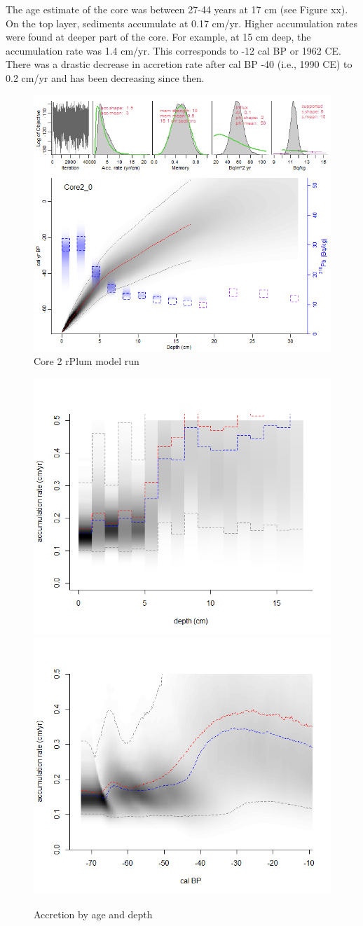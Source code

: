 \documentclass[
  12pt,
]{article}
\begin{document}
The age estimate of the core was between 27-44 years at 17 cm (see
Figure xx). On the top layer, sediments accumulate at 0.17 cm/yr. Higher
accumulation rates were found at deeper part of the core. For example,
at 15 cm deep, the accumulation rate was 1.4 cm/yr. This corresponds to
-12 cal BP or 1962 CE. There was a drastic decrease in accretion rate
after cal BP -40 (i.e., 1990 CE) to 0.2 cm/yr and has been decreasing
since then.

\begin{figure}
\centering
\includegraphics{core2_rplumplot_accmean_3.png}
\caption{Core 2 rPlum model run}
\end{figure}

\begin{figure}
\includegraphics[width=0.5\linewidth]{c02_accdepth_accmean3} \includegraphics[width=0.5\linewidth]{c02_accage_accmean3} \caption{Accretion by age and depth}\label{fig:agedepth2}
\end{figure}
\end{document}
